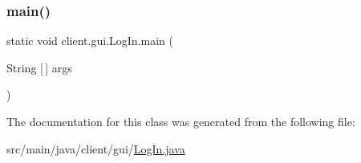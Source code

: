 \subsubsection{\texorpdfstring{main()}{main()}}
{\footnotesize\ttfamily static void client.\+gui.\+Log\+In.\+main (\begin{DoxyParamCaption}\item[{String \mbox{[}$\,$\mbox{]}}]{args }\end{DoxyParamCaption})\hspace{0.3cm}{\ttfamily [static]}}



The documentation for this class was generated from the following file\+:\begin{DoxyCompactItemize}
\item 
src/main/java/client/gui/\hyperlink{_log_in_8java}{Log\+In.\+java}\end{DoxyCompactItemize}
